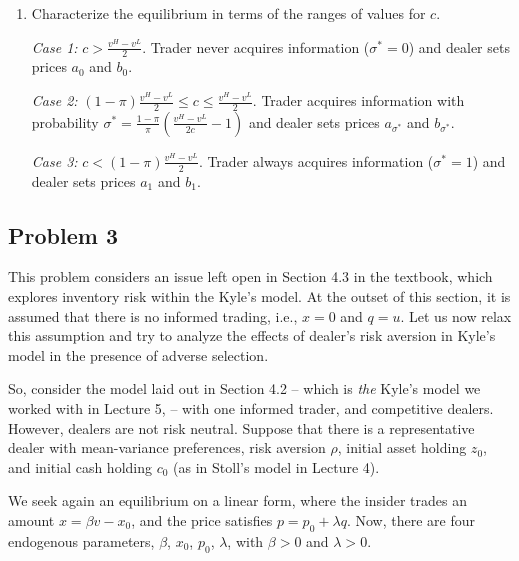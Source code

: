 \documentclass[11pt
, answers
]{exam}
\begin{document}
\begin{enumerate} [label=(\alph*). ]
\begin{solution}
\end{solution}


\item Characterize the equilibrium in terms of the ranges of values for $c$. 

\begin{solution}
  \textit{Case 1:} $c > \frac{v^H-v^L}{2}$. Trader never acquires information ($\sigma^*=0$) and dealer sets prices $a_0$ and $b_0$. 
  
  \textit{Case 2:} $(1-\pi) \frac{v^H-v^L}{2} \le c \le \frac{v^H-v^L}{2}$. Trader acquires information with probability $\sigma^*=\frac{1-\pi}{\pi} \left(\frac{v^H-v^L}{2c} -1 \right)$ and dealer sets prices $a_{\sigma^*}$ and $b_{\sigma^*}$. 
  
  \textit{Case 3:} $c<(1-\pi) \frac{v^H-v^L}{2}$. Trader always acquires information ($\sigma^*=1$) and dealer sets prices $a_1$ and $b_1$.
\end{solution}

\end{enumerate}



\qquad
\subsection*{Problem 3}


This problem considers an issue left open in Section 4.3 in the textbook, which explores inventory risk within the Kyle's model. At the outset of this section, it is assumed that there is no informed trading, i.e., $x = 0$ and $q = u$. Let us now relax this assumption and try to analyze the effects of dealer's risk aversion in Kyle's model in the presence of adverse selection.

So, consider the model laid out in Section 4.2 -- which is \emph{the} Kyle's model we worked with in Lecture 5, -- with one informed trader, and competitive dealers. However, dealers are not risk neutral. Suppose that there is a representative dealer with mean-variance preferences, risk aversion $\rho$, initial asset holding $z_{0}$, and initial cash holding $c_{0}$ (as in Stoll's model in Lecture 4).

We seek again an equilibrium on a linear form, where the insider trades an amount $x =	\beta v - x_{0}$, and the price satisfies $p = p_{0}+\lambda q$. Now, there are four endogenous parameters, $\beta$, $x_{0}$, $p_{0}$, $\lambda$, with $\beta>0$ and $\lambda>0$.
\end{document}
